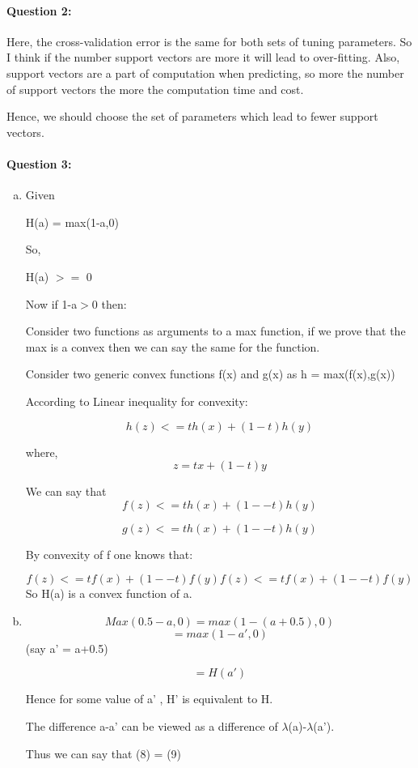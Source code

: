 \documentclass[letterpaper,11pt]{article}
\begin{document}
\paragraph{Question 2:} 
Here, the cross-validation error is the same for both sets of tuning parameters. So I think if the number support vectors are more it will lead to over-fitting. Also, support vectors are a part of computation when predicting, so more the number of support vectors the more the computation time and cost.

Hence, we should choose the set of parameters which lead to fewer support vectors.

\paragraph{Question 3:}
\begin{enumerate}[(a)]
\item

Given

H(a) = max(1-a,0) 

So,

H(a) $>=$ 0

Now if 1-a$>$0 then:

Consider two functions as arguments to a max function, if we prove that the max is a convex then we can say the same for the function.

Consider two generic convex functions f(x)  and g(x) as
 h = max(f(x),g(x))

According to Linear inequality for convexity: 

\[
	h(z) <= t h(x)+(1-t) h(y) 
\]

where, 
\[
	z= t x +(1-t) y 
\]

We can say that
\begin{equation}
f(z)<=t h(x)+(1−-t)h(y)
\end{equation}

\begin{equation}
g(z)<=t h(x)+(1-−t)h(y)
\end{equation}

By convexity of f one knows that:

\begin{equation}
f(z)<=t f(x)+(1−-t)f(y)f(z)<=t f(x)+(1−-t)f(y)
\end{equation}
So H(a) is a convex function of a.


\item

\[
	Max(0.5-a,0) = max(1-(a+0.5),0)
\]
\[
	=max(1-a',0) 
\]
(say a' = a+0.5)

\[
	=H(a') 
\]


Hence for some value of a' , H' is equivalent to H.

The difference a-a' can be viewed as a difference of $\lambda$(a)-$\lambda$(a').

Thus we can say that (8) = (9)


\end{enumerate}
\end{document}
